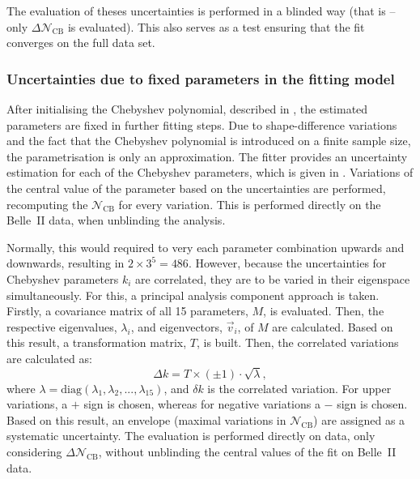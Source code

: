 The evaluation of theses uncertainties is performed in a blinded way (that is -- only $\Delta\mathcal{N}_{\mathrm{CB}}$  is evaluated).
This also serves as a test ensuring that the fit converges on the full data set.

\subsubsection{Uncertainties due to fixed parameters in the \texorpdfstring{\Mbc}{Mbc} fitting model}\label{sec:fitting_model_uncertainties}

After initialising the Chebyshev polynomial, described in , the estimated parameters are fixed in further fitting steps.
Due to shape-difference variations and the fact that the Chebyshev polynomial is introduced on a finite sample size, the parametrisation is only an approximation.
The \Mbc fitter provides an uncertainty estimation for each of the Chebyshev \PDF parameters, which is given in .
Variations of the central value of the parameter based on the uncertainties are performed, recomputing the $\mathcal{N}_{\mathrm{CB}}$ for every variation.
This is performed directly on the Belle~II data, when unblinding the analysis.

Normally, this would required to very each parameter combination upwards and downwards, resulting in $2\times3^5=486$.
However, because the uncertainties for Chebyshev parameters $k_i$ are correlated, they are to be varied in their eigenspace simultaneously.
For this, a principal analysis component approach is taken.
Firstly, a covariance matrix of all 15 parameters, $M$, is evaluated.
Then, the respective eigenvalues, $\lambda_i$, and eigenvectors, $\vec{v}_i$, of $M$ are calculated.
Based on this result, a transformation matrix, $T$, is built.
Then, the correlated variations are calculated as:
\begin{equation}
    \Delta k = T \times (\pm1)\cdot \sqrt{\lambda},
\end{equation}
where $\lambda=\mathrm{diag}(\lambda_1, \lambda_2,...,\lambda_{15})$, and $\delta k$ is the correlated variation.
For upper variations, a $+$ sign is chosen, whereas for negative variations a $-$ sign is chosen.
Based on this result, an envelope (maximal variations in $\mathcal{N}_{\mathrm{CB}}$) are assigned as a systematic uncertainty.
The evaluation is performed directly on data, only considering $\Delta\mathcal{N}_{\mathrm{CB}}$, without unblinding the central values of the \Mbc fit on Belle~II data.

